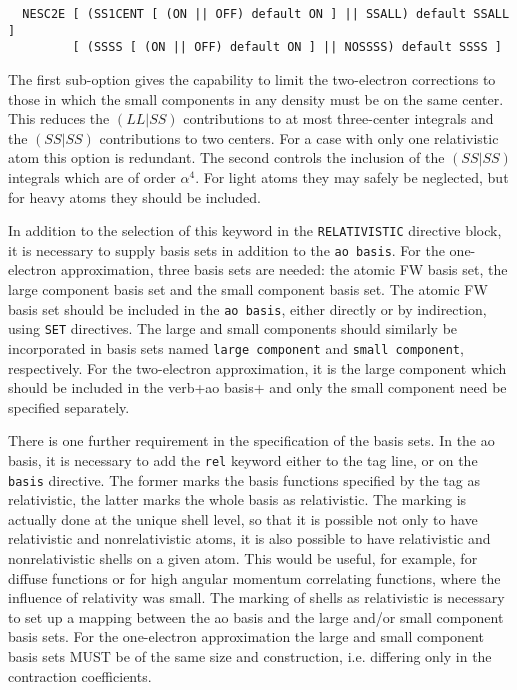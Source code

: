 \begin{verbatim}
  NESC2E [ (SS1CENT [ (ON || OFF) default ON ] || SSALL) default SSALL ]
         [ (SSSS [ (ON || OFF) default ON ] || NOSSSS) default SSSS ]

\end{verbatim}

The first sub-option gives the capability to limit the two-electron
corrections to those in which the small components in any density must be on
the same center.  This reduces the $(LL|SS)$ contributions to at most
three-center integrals and the $(SS|SS)$ contributions to two centers. For a
case with only one relativistic atom this option is redundant. The second
controls the inclusion of the $(SS|SS)$ integrals which are of order
$\alpha^4$. For light atoms they may safely be neglected, but for heavy
atoms they should be included. 

In addition to the selection of this keyword in the \verb+RELATIVISTIC+
directive block, it is necessary to supply basis sets in addition to the
\verb+ao basis+. For the one-electron approximation, three basis sets are
needed: the atomic FW basis set, the large component basis set and the small
component basis set. The atomic FW basis set should be included in the
\verb+ao basis+, either directly or by indirection, using \verb+SET+
directives.  The large and small components should similarly be incorporated
in basis sets named \verb+large component+ and \verb+small component+,
respectively. For the two-electron approximation, it is the large component
which should be included in the verb+ao basis+ and only the small component
need be specified separately.

There is one further requirement in the specification of the basis sets. In
the ao basis, it is necessary to add the \verb+rel+ keyword either to the
tag line, or on the \verb+basis+ directive. The former marks the basis
functions specified by the tag as relativistic, the latter marks the whole
basis as relativistic. The marking is actually done at the unique shell
level, so that it is possible not only to have relativistic and
nonrelativistic atoms, it is also possible to have relativistic and
nonrelativistic shells on a given atom. This would be useful, for example,
for diffuse functions or for high angular momentum correlating functions,
where the influence of relativity was small. The marking of shells as
relativistic is necessary to set up a mapping between the ao basis and the
large and/or small component basis sets. For the one-electron approximation
the large and small component basis sets MUST be of the same size and
construction, i.e. differing only in the contraction coefficients.

